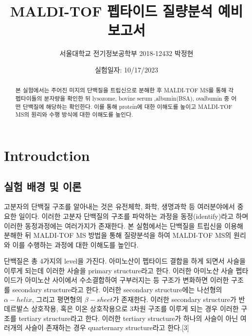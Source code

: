 \documentclass[%
 reprint,
 amsmath,amssymb,
 aps,
]{revtex4-2}
\begin{document}
\title{MALDI-TOF 펩타이드 질량분석 예비보고서}

\author{서울대학교 전기정보공학부 2018-12432 박정현}
\date{실험일자: 10/17/2023}%

\begin{abstract}
본 실험에서는 주어진 미지의 단백질을 트립신으로 분해한 후 MALDI-TOF MS를 통해 각 펩타이들의 분자량을 확인한 뒤 lysozome, bovine serum ,albumin(BSA), ovalbumin 중 어떤 단백질에 해당하는 확인한다. 이를 통해 protein에 대한 이해도를 높이고 MALDI-TOF MS의 원리와 수행 방식에 대한 이해도를 높인다.
\end{abstract}

\maketitle


\section{\label{sec:level1}Introudction}
\subsection{\label{sec:level2}실험 배경 및 이론}
고분자의 단백질 구조를 알아내는 것은 유전체학, 화학, 생명과학 등 여러분야에서 중요한 일이다. 이러한 고분자 단백질의 구조를 파악하는 과정을 동정(identify)라고 하며 이러한 동정과정에는 여러가지가 존재한다. 본 실험에서는 단백질을 트립신을 이용해 분해한 뒤 MALDI-TOF MS 방법을 통해 질량분석을 하여 MALDI-TOF MS의 원리와 이를 수행하는 과정에 대한 이해도를 높인다.

단백질은 총 4가지의 level을 가진다. 아미노산이 펩타이드 결합을 하게 되면서 사슬을 이루게 되는데 이러한 사슬을 primary structure라고 한다. 이러한 아미노산 사슬 펩타이드가 아미노산 사이에서 수소결합하여 구부러지는 등 구조가 변화하면 이러한 구조를 secondary structure라고 한다. 이러한 secondary structure에는 나선형의 $\alpha-helix$, 그리고 평면형의 $\beta-sheet$가 존재한다. 이러한 secondary structure가 반데르발스 상호작용, 혹은 이온 상호작용으로 3차원 구조를 이루게 되는 경우 이러한 구조를 tertiary structure라고 한다. 이러한 tertiary structure가 하나의 사슬이 아닌 여러개의 사슬이 존재하는 경우 quarternary structure라고 한다.[3]
\end{document}
